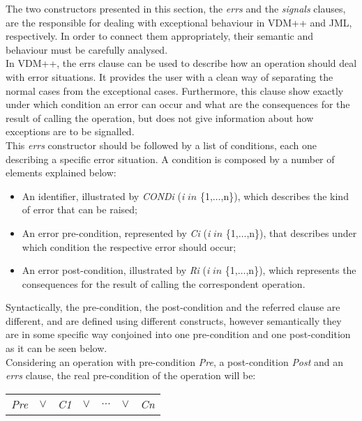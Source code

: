 The two constructors presented in this section, the \textit{errs} and the \textit{signals} clauses, are the responsible for dealing with exceptional behaviour in VDM++ and JML, respectively. In order to connect them appropriately, their semantic and behaviour must be carefully analysed.\\
In VDM++, the errs clause can be used to describe how an operation should deal with error situations. It provides the user with a clean way of separating the normal cases from the exceptional cases. Furthermore, this clause show exactly under which condition an error can occur and what are the consequences for the result of calling the operation, but does not give information about how exceptions are to be signalled.\\
This \textit{errs} constructor should be followed by a list of conditions, each one describing a specific error situation. A condition is composed by a number of elements explained below:
\begin{itemize}
\item An identifier, illustrated by \textit{CONDi} (\textit{i} $in$ \{1,$\ldots$,n\}), which describes the kind of error that can be raised;
\item An error pre-condition, represented by \textit{Ci} (\textit{i} $in$ \{1,$\ldots$,n\}), that describes under which condition the respective error should occur;
\item An error post-condition, illustrated by \textit{Ri} (\textit{i} $in$ \{1,$\ldots$,n\}), which represents the consequences for the result of calling the correspondent operation.
\end{itemize}
Syntactically, the pre-condition, the post-condition and the referred clause are different, and are defined using different constructs, however semantically they are in some specific way conjoined into one pre-condition and one post-condition as it can be seen below.\\
Considering an operation with pre-condition \textit{Pre}, a post-condition \textit{Post} and an \textit{errs} clause, the real pre-condition of the operation will be:

\begin{center}
\begin{tabular}{ccccccc}
\textit{Pre} & $\lor$ & \textit{C1} & $\lor$ & $\ldots$ & $\lor$ & \textit{Cn}\\
\end{tabular}
\end{center}

